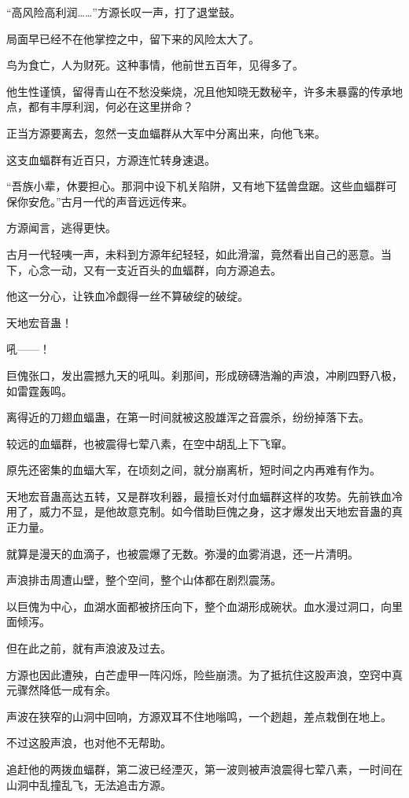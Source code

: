 \begin{this_body}
“高风险高利润……”方源长叹一声，打了退堂鼓。

局面早已经不在他掌控之中，留下来的风险太大了。

鸟为食亡，人为财死。这种事情，他前世五百年，见得多了。

他生性谨慎，留得青山在不愁没柴烧，况且他知晓无数秘辛，许多未暴露的传承地点，都有丰厚利润，何必在这里拼命？

正当方源要离去，忽然一支血蝠群从大军中分离出来，向他飞来。

这支血蝠群有近百只，方源连忙转身速退。

“吾族小辈，休要担心。那洞中设下机关陷阱，又有地下猛兽盘踞。这些血蝠群可保你安危。”古月一代的声音远远传来。

方源闻言，逃得更快。

古月一代轻咦一声，未料到方源年纪轻轻，如此滑溜，竟然看出自己的恶意。当下，心念一动，又有一支近百头的血蝠群，向方源追去。

他这一分心，让铁血冷觑得一丝不算破绽的破绽。

天地宏音蛊！

吼——！

巨傀张口，发出震撼九天的吼叫。刹那间，形成磅礴浩瀚的声浪，冲刷四野八极，如雷霆轰鸣。

离得近的刀翅血蝠蛊，在第一时间就被这股雄浑之音震杀，纷纷掉落下去。

较远的血蝠群，也被震得七荤八素，在空中胡乱上下飞窜。

原先还密集的血蝠大军，在顷刻之间，就分崩离析，短时间之内再难有作为。

天地宏音蛊高达五转，又是群攻利器，最擅长对付血蝠群这样的攻势。先前铁血冷用了，威力不显，是他故意克制。如今借助巨傀之身，这才爆发出天地宏音蛊的真正力量。

就算是漫天的血滴子，也被震爆了无数。弥漫的血雾消退，还一片清明。

声浪排击周遭山壁，整个空间，整个山体都在剧烈震荡。

以巨傀为中心，血湖水面都被挤压向下，整个血湖形成碗状。血水漫过洞口，向里面倾泻。

但在此之前，就有声浪波及过去。

方源也因此遭殃，白芒虚甲一阵闪烁，险些崩溃。为了抵抗住这股声浪，空窍中真元骤然降低一成有余。

声波在狭窄的山洞中回响，方源双耳不住地嗡鸣，一个趔趄，差点栽倒在地上。

不过这股声浪，也对他不无帮助。

追赶他的两拨血蝠群，第二波已经湮灭，第一波则被声浪震得七荤八素，一时间在山洞中乱撞乱飞，无法追击方源。


\end{this_body}

